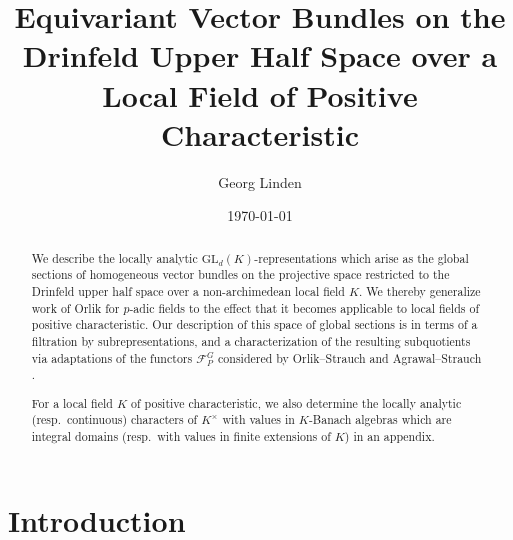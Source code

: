 \documentclass[a4paper, reqno, 10pt]{amsart}
\title[Equivariant Vector Bundles on the Drinfeld Upper Half Space]{Equivariant Vector Bundles on the Drinfeld Upper Half Space over a Local Field of Positive Characteristic}
\author{Georg Linden}
\date{\today}
\theoremstyle{definition}
\numberwithin{equation}{section}
\newcommand{\GL}{{\mathrm{GL}}}
\newcommand{\CF}{{\mathcal {F}}}
\begin{document}
\begin{abstract}
	We describe the locally analytic $\GL_d(K)$-representations which arise as the global sections of homogeneous vector bundles on the projective space restricted to the Drinfeld upper half space over a non-archimedean local field $K$. 
	We thereby generalize work of Orlik \cite{Orlik08EquivVBDrinfeldUpHalfSp} for $p$-adic fields to the effect that it becomes applicable to local fields of positive characteristic.	
	Our description of this space of global sections is in terms of a filtration by subrepresentations, and a characterization of the resulting subquotients via  adaptations of the functors $\CF^G_P$ considered by Orlik--Strauch \cite{OrlikStrauch15JordanHoelderSerLocAnRep} and Agrawal--Strauch \cite{AgrawalStrauch22FromCatOLocAnRep}.
	
	
	For a local field $K$ of positive characteristic, we also determine the locally analytic (resp.\ continuous) characters of $K^\times$ with values in $K$-Banach algebras which are integral domains (resp.\ with values in finite extensions of $K$) in an appendix.
\end{abstract}




\maketitle


\tableofcontents


\section*{Introduction}
\end{document}

